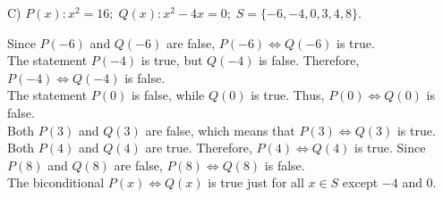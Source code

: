 \documentclass[12pt]{article}
\newenvironment{problem}[2][Problem]{\begin{trivlist}
		\item[\hskip \labelsep {\bfseries #1}\hskip \labelsep {\bfseries #2.}]}{\end{trivlist}}
\newenvironment{solution}[2][Solution]{\begin{trivlist}
		\item[\hskip \labelsep {\bfseries #1}\hskip \labelsep {\bfseries #2.}]}{\end{trivlist}}
\begin{document}
\begin{problem}{39}
	(C) $P(x): x^{2} = 16; \; Q(x): x^{2} - 4x = 0; \; S = \{-6, -4, 0, 3, 4, 8\}$.
	\begin{solution}{c}
		Since $P(-6)$ and $Q(-6)$ are false, $P(-6) \Leftrightarrow Q(-6)$ is true.\\
		The statement $P(-4)$ is true, but $Q(-4)$ is false. Therefore, $P(-4) \Leftrightarrow Q(-4)$ is false.\\
		The statement $P(0)$ is false, while $Q(0)$ is true. Thus, $P(0) \Leftrightarrow Q(0)$ is false.\\
		Both $P(3)$ and $Q(3)$ are false, which means that $P(3) \Leftrightarrow Q(3)$ is true.\\
		Both $P(4)$ and $Q(4)$ are true. Therefore, $P(4) \Leftrightarrow Q(4)$ is true.
		Since $P(8)$ and $Q(8)$ are false, $P(8) \Leftrightarrow Q(8)$ is false.\\
		The biconditional $P(x) \Leftrightarrow Q(x)$ is true just for all $x \in S$ except $-4$ and 0.
	\end{solution}
\end{problem}
\end{document}
